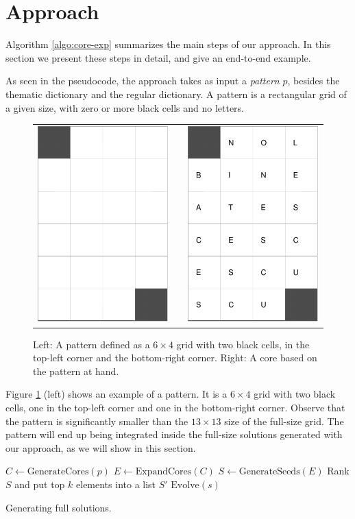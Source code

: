 \section{Approach}

Algorithm \ref{algo:core-exp} summarizes the main steps of our approach.
In this section we present these steps in detail, and give an end-to-end example.

As seen in the pseudocode, the approach takes as input a \emph{pattern} $p$, besides
the thematic dictionary and the regular dictionary.
A {pattern} is a rectangular grid of a given size, with zero or more black cells and no letters.

\begin{figure}
\centering
\begin{tabular}{ccc}
\includegraphics[width=.15\textwidth]{_plots/6x4-puzzle.pdf} & &
\includegraphics[width=.15\textwidth]{_plots/core-6x4-puzzle.pdf}
\end{tabular}
\caption{Left: A pattern defined as a $6 \times 4$ grid with two black cells, in the top-left corner and the bottom-right corner. Right: A core based on the pattern at hand.}
\label{fig:pattern}
\end{figure}

Figure \ref{fig:pattern} (left) shows an example of a pattern. It is a $6 \times 4$ grid with two black cells, one in the top-left corner and one in the bottom-right corner.
Observe that the pattern is significantly smaller than the $13 \times 13$ size of the full-size grid.
The pattern will end up being integrated inside the full-size solutions generated with our approach,
as we will show in this section.

\begin{algorithm}[t]
\DontPrintSemicolon %
$C \leftarrow \mbox{GenerateCores}(p)$\;
$E \leftarrow \mbox{ExpandCores}(C)$\;
$S \leftarrow \mbox{GenerateSeeds}(E)$\;
Rank $S$ and put top $k$ elements into a list $S'$\;
 {
    $\mbox{Evolve}(s)$\;
}
\caption{{\sc Generating full solutions.}}
\label{algo:core-exp}
\end{algorithm}


